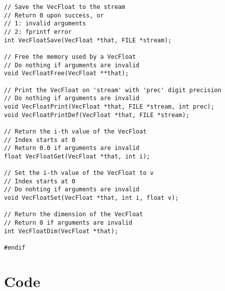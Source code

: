 \documentclass[12pt, a4paper]{article}
\begin{document}
\begin{scriptsize}
\begin{ttfamily}
\begin{lstlisting}
// Save the VecFloat to the stream
// Return 0 upon success, or
// 1: invalid arguments
// 2: fprintf error
int VecFloatSave(VecFloat *that, FILE *stream);

// Free the memory used by a VecFloat
// Do nothing if arguments are invalid
void VecFloatFree(VecFloat **that);

// Print the VecFloat on 'stream' with 'prec' digit precision
// Do nothing if arguments are invalid
void VecFloatPrint(VecFloat *that, FILE *stream, int prec);
void VecFloatPrintDef(VecFloat *that, FILE *stream);

// Return the i-th value of the VecFloat
// Index starts at 0
// Return 0.0 if arguments are invalid
float VecFloatGet(VecFloat *that, int i);

// Set the i-th value of the VecFloat to v
// Index starts at 0
// Do nohting if arguments are invalid
void VecFloatSet(VecFloat *that, int i, float v);

// Return the dimension of the VecFloat
// Return 0 if arguments are invalid
int VecFloatDim(VecFloat *that);

#endif
\end{lstlisting}
\end{ttfamily}
\end{scriptsize}

\section{Code}
\end{document}
